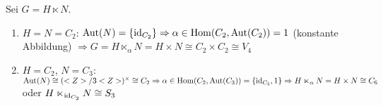 \begin{example}
	Sei $G=H\ltimes N$.
	\begin{enumerate}[label=(\alph*)]
		\item $H=N=C_2$: $\operatorname{Aut}(N)=\{\operatorname{id}_{C_2}\}\Rightarrow\alpha\in\operatorname{Hom}(C_2,\operatorname{Aut}(C_2))=1$ (konstante Abbildung) $\Rightarrow G = H\ltimes_{\alpha} N=H\times N\cong C_2\times C_2\cong V_4$
		\item $H=C_2$, $N=C_3$: $\operatorname{Aut}(N)\cong (<Z>/3<Z>)^\times\cong C_2 \Rightarrow \alpha\in\operatorname{Hom}(C_2,\operatorname{Aut}(C_3))=\{\operatorname{id}_{C_2}, 1\}\Rightarrow H\ltimes_{\alpha} N = H\times N\cong C_6$ oder $H\ltimes_{\operatorname{id}_{C_2}}N\cong S_3$
	\end{enumerate}
\end{example}
